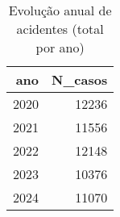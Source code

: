 \begin{table}
\caption{Evolução anual de acidentes (total por ano)}
\begin{tabular}{rr}
\toprule
ano & N_casos \\
\midrule
2020 & 12236 \\
2021 & 11556 \\
2022 & 12148 \\
2023 & 10376 \\
2024 & 11070 \\
\bottomrule
\end{tabular}
\end{table}

